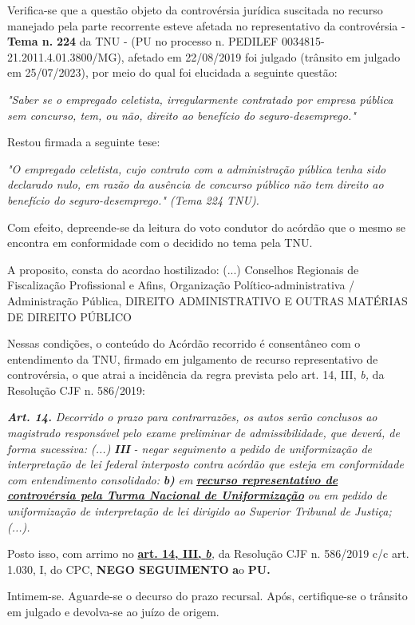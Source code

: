 \documentclass[12pt]{article}
\begin{document}
\justifying
\noindent Verifica-se que a questão objeto da controvérsia jurídica suscitada no recurso manejado pela parte recorrente esteve afetada no representativo da controvérsia - \textbf{Tema n. }\textbf{224} da TNU - (PU no processo n. PEDILEF 0034815-21.2011.4.01.3800/MG),  afetado em 22/08/2019 foi julgado (trânsito em julgado em 25/07/2023), por meio do qual foi elucidada a seguinte questão:

\noindent \textit{"Saber se o empregado celetista, irregularmente contratado por empresa pública sem concurso, tem, ou não, direito ao benefício do seguro-desemprego."}

\noindent Restou firmada a seguinte tese:

\noindent \textit{"O empregado celetista, cujo contrato com a administração pública tenha sido declarado nulo, em razão da ausência de concurso público não tem direito ao benefício do seguro-desemprego." (Tema 224 TNU).}

\noindent Com efeito, depreende-se da leitura do voto condutor do acórdão que o mesmo se encontra em conformidade com o decidido no  tema pela TNU.

\noindent A proposito, consta do acordao hostilizado: (...) Conselhos Regionais de Fiscalização Profissional e Afins, Organização Político-administrativa / Administração Pública, DIREITO ADMINISTRATIVO E OUTRAS MATÉRIAS DE DIREITO PÚBLICO

\noindent Nessas condições, o conteúdo do Acórdão recorrido é consentâneo com o entendimento da TNU, firmado em julgamento de recurso representativo de controvérsia, o que atrai a incidência da regra prevista pelo art. 14, III, \textit{b,} da Resolução CJF n. 586/2019:

\noindent \textit{\textbf{Art. 14.}}\textit{ Decorrido o prazo para contrarrazões, os autos serão conclusos ao magistrado responsável pelo exame preliminar de admissibilidade, que deverá, de forma sucessiva: (...) }\textit{\textbf{III }}\textit{- negar seguimento a pedido de uniformização de interpretação de lei federal interposto contra acórdão que esteja em conformidade com entendimento consolidado: }\textit{\textbf{b)}}\textit{ em }\uline{\textit{\textbf{recurso representativo de controvérsia pela Turma Nacional de Uniformização}}}\textit{ ou em pedido de uniformização de interpretação de lei dirigido ao Superior Tribunal de Justiça;(...).}

\noindent Posto isso, com arrimo no \uline{\textbf{art. 14, III, }}\uline{\textit{\textbf{b}}}\textit{,} da Resolução CJF n. 586/2019 c/c art. 1.030, I, do CPC, \textbf{NEGO SEGUIMENTO }\textbf{a}o\textbf{ PU}\textbf{.}

\noindent Intimem-se. Aguarde-se o decurso do prazo recursal. Após, certifique-se o trânsito em julgado e devolva-se ao juízo de origem.
\end{document}
